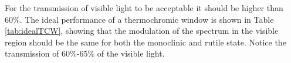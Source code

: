 %
For the transmission of visible light to be acceptable it should be higher than 60\%.
The ideal performance of a thermochromic window is shown in Table \ref{tab:idealTCW}, showing 
that the modulation of the spectrum in the visible region should be the same for both the 
monoclinic and rutile state. Notice the transmission of 60\%-65\% of the visible light.
\\
\\




